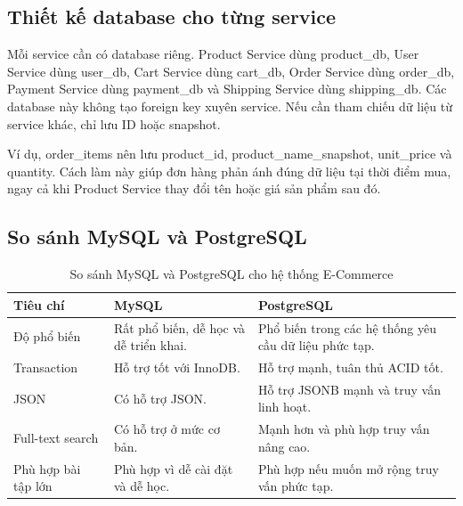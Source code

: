 \documentclass[../main.tex]{subfiles}
\begin{document}
\subsection{Thiết kế database cho từng service}
\label{subsection:2.10.4}

Mỗi service cần có database riêng. Product Service dùng product\_db, User Service dùng user\_db, Cart Service dùng cart\_db, Order Service dùng order\_db, Payment Service dùng payment\_db và Shipping Service dùng shipping\_db. Các database này không tạo foreign key xuyên service. Nếu cần tham chiếu dữ liệu từ service khác, chỉ lưu ID hoặc snapshot.

Ví dụ, order\_items nên lưu product\_id, product\_name\_snapshot, unit\_price và quantity. Cách làm này giúp đơn hàng phản ánh đúng dữ liệu tại thời điểm mua, ngay cả khi Product Service thay đổi tên hoặc giá sản phẩm sau đó.

\subsection{So sánh MySQL và PostgreSQL}
\label{subsection:2.10.5}

\begin{table}[H]
    \centering
    \caption{So sánh MySQL và PostgreSQL cho hệ thống E-Commerce}
    \label{tab:chapter2-mysql-postgresql}
    \begin{tabular}{|p{}|p{}|p{}|}
        \hline
        \rowcolor{primary!35}
        \textbf{Tiêu chí} & \textbf{MySQL} & \textbf{PostgreSQL} \\
        \hline
        Độ phổ biến & Rất phổ biến, dễ học và dễ triển khai. & Phổ biến trong các hệ thống yêu cầu dữ liệu phức tạp. \\
        \hline
        Transaction & Hỗ trợ tốt với InnoDB. & Hỗ trợ mạnh, tuân thủ ACID tốt. \\
        \hline
        JSON & Có hỗ trợ JSON. & Hỗ trợ JSONB mạnh và truy vấn linh hoạt. \\
        \hline
        Full-text search & Có hỗ trợ ở mức cơ bản. & Mạnh hơn và phù hợp truy vấn nâng cao. \\
        \hline
        Phù hợp bài tập lớn & Phù hợp vì dễ cài đặt và dễ học. & Phù hợp nếu muốn mở rộng truy vấn phức tạp. \\
        \hline
    \end{tabular}
\end{table}
\end{document}
